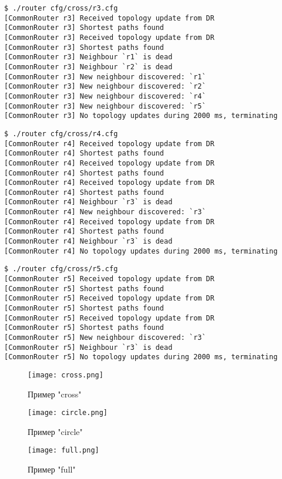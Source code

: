 \documentclass{report}
\begin{document}
\begin{verbatim}
$ ./router cfg/cross/r3.cfg 
[CommonRouter r3] Received topology update from DR
[CommonRouter r3] Shortest paths found
[CommonRouter r3] Received topology update from DR
[CommonRouter r3] Shortest paths found
[CommonRouter r3] Neighbour `r1` is dead
[CommonRouter r3] Neighbour `r2` is dead
[CommonRouter r3] New neighbour discovered: `r1`
[CommonRouter r3] New neighbour discovered: `r2`
[CommonRouter r3] New neighbour discovered: `r4`
[CommonRouter r3] New neighbour discovered: `r5`
[CommonRouter r3] No topology updates during 2000 ms, terminating
\end{verbatim}
\begin{verbatim}
$ ./router cfg/cross/r4.cfg 
[CommonRouter r4] Received topology update from DR
[CommonRouter r4] Shortest paths found
[CommonRouter r4] Received topology update from DR
[CommonRouter r4] Shortest paths found
[CommonRouter r4] Received topology update from DR
[CommonRouter r4] Shortest paths found
[CommonRouter r4] Neighbour `r3` is dead
[CommonRouter r4] New neighbour discovered: `r3`
[CommonRouter r4] Received topology update from DR
[CommonRouter r4] Shortest paths found
[CommonRouter r4] Neighbour `r3` is dead
[CommonRouter r4] No topology updates during 2000 ms, terminating
\end{verbatim}
\begin{verbatim}
$ ./router cfg/cross/r5.cfg 
[CommonRouter r5] Received topology update from DR
[CommonRouter r5] Shortest paths found
[CommonRouter r5] Received topology update from DR
[CommonRouter r5] Shortest paths found
[CommonRouter r5] Received topology update from DR
[CommonRouter r5] Shortest paths found
[CommonRouter r5] New neighbour discovered: `r3`
[CommonRouter r5] Neighbour `r3` is dead
[CommonRouter r5] No topology updates during 2000 ms, terminating

\end{verbatim}
\begin{figure}[!htb]
   \begin{minipage}{0.3\textwidth}
     \centering
     \texttt{[image: cross.png]}
     \caption{Пример "cross"}\label{Fig:Data1}
   \end{minipage}\hfill
   \begin{minipage}{0.3\textwidth}
     \centering
     \texttt{[image: circle.png]}
     \caption{Пример "circle"}\label{Fig:Data2}
   \end{minipage}\hfill
   \begin{minipage}{0.3\textwidth}
     \centering
     \texttt{[image: full.png]}
     \caption{Пример "full"}\label{Fig:Data2}
   \end{minipage}
\end{figure}
\end{document}
